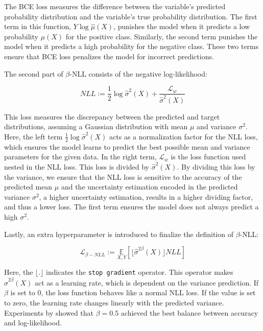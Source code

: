 The BCE loss measures the difference between the variable's predicted probability distribution and the variable's true probability distribution. The first term in this function, $Y \log \hat{\mu}(X)$, punishes the model when it predicts a low probability $\mu(X)$ for the positive class. Similarly, the second term punishes the model when it predicts a high probability for the negative class. These two terms ensure that BCE loss penalizes the model for incorrect predictions.

The second part of $\beta$-NLL consists of the negative log-likelihood:

\begin{equation}
    NLL := \frac{1}{2}\log \hat{\sigma}^2(X) + \frac{\mathcal{L}_w}{\hat{\sigma}^2(X)}
\end{equation}

This loss measures the discrepancy between the predicted and target distributions, assuming a Gaussian distribution with mean $\mu$ and variance $\sigma^2$. Here, the left term $\frac{1}{2}\log \hat{\sigma}^2(X)$ acts as a normalization factor for the NLL loss, which ensures the model learns to predict the best possible mean and variance parameters for the given data. In the right term, $\mathcal{L}_w$ is the loss function used nested in the NLL loss. This loss is divided by $\hat{\sigma}^2(X)$. By dividing this loss by the variance, we ensure that the NLL loss is sensitive to the accuracy of the predicted mean $\mu$ and the uncertainty estimation encoded in the predicted variance $\sigma^2$, a higher uncertainty estimation, results in a higher dividing factor, and thus a lower loss. The first term ensures the model does not always predict a high $\sigma^2$.


Lastly, an extra hyperparameter is introduced to finalize the definition of $\beta$-NLL:

\begin{equation}
    \mathcal{L}_{\beta-NLL} := \underset{X, Y}{\mathbb{E}} \left[ \lfloor \hat{\sigma}^{2\beta}(X) \rfloor NLL \right]
\end{equation}

Here, the $\lfloor. \rfloor$ indicates the \verb|stop gradient| operator. This operator makes $\hat{\sigma}^{2\beta}(X)$ act as a learning rate, which is dependent on the variance prediction. If $\beta$ is set to 0, the loss function behaves like a normal NLL loss. If the value is set to zero, the learning rate changes linearly with the predicted variance. Experiments by \cite{seitzer2022pitfalls} showed that $\beta = 0.5$ achieved the best balance between accuracy and log-likelihood.

